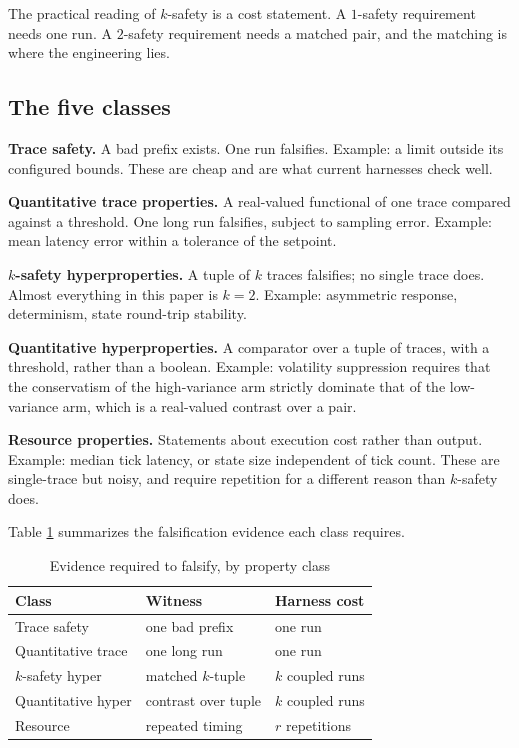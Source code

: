 \documentclass[conference]{IEEEtran}
\begin{document}
	The practical reading of $k$-safety is a cost statement. A $1$-safety
	requirement needs one run. A $2$-safety requirement needs a matched pair,
	and the matching is where the engineering lies.
	
	\subsection{The five classes}
	
	\textbf{Trace safety.} A bad prefix exists. One run falsifies. Example: a
	limit outside its configured bounds. These are cheap and are what current
	harnesses check well.
	
	\textbf{Quantitative trace properties.} A real-valued functional of one
	trace compared against a threshold. One long run falsifies, subject to
	sampling error. Example: mean latency error within a tolerance of the
	setpoint.
	
	\textbf{$k$-safety hyperproperties.} A tuple of $k$ traces falsifies; no
	single trace does. Almost everything in this paper is $k=2$. Example:
	asymmetric response, determinism, state round-trip stability.
	
	\textbf{Quantitative hyperproperties.} A comparator over a tuple of traces,
	with a threshold, rather than a boolean. Example: volatility suppression
	requires that the conservatism of the high-variance arm strictly dominate
	that of the low-variance arm, which is a real-valued contrast over a pair.
	
	\textbf{Resource properties.} Statements about execution cost rather than
	output. Example: median tick latency, or state size independent of tick
	count. These are single-trace but noisy,
	and require repetition for a different reason than $k$-safety does.
	
	Table \ref{tab:classes} summarizes the falsification evidence each class
	requires.
	
	\begin{table}[t]
		\caption{Evidence required to falsify, by property class}
		\label{tab:classes}
		\centering
		\small
		\begin{tabular}{@{}lll@{}}
			\toprule
			Class & Witness & Harness cost \\
			\midrule
			Trace safety & one bad prefix & one run \\
			Quantitative trace & one long run & one run \\
			$k$-safety hyper & matched $k$-tuple & $k$ coupled runs \\
			Quantitative hyper & contrast over tuple & $k$ coupled runs \\
			Resource & repeated timing & $r$ repetitions \\
			\bottomrule
		\end{tabular}
	\end{table}
	
\end{document}
